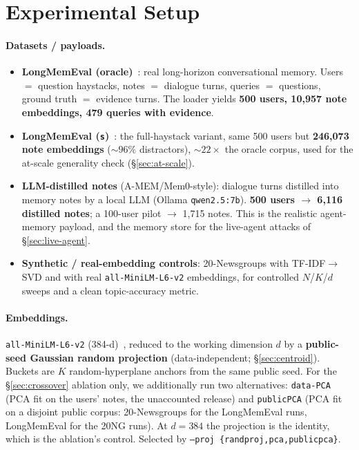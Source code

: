 \documentclass[pdflatex,sn-mathphys-num,iicol]{sn-jnl}
\theoremstyle{thmstyleone}%
\theoremstyle{thmstyletwo}%
\theoremstyle{thmstylethree}%
\newcommand{\secref}[1]{\S\ref{#1}}
\begin{document}
\section{Experimental Setup}\label{sec:setup}

\paragraph{Datasets / payloads.}
\begin{itemize}
  \item \textbf{LongMemEval (oracle)}~\cite{wu2024longmemeval}: real long-horizon
    conversational memory. Users $=$ question haystacks, notes $=$ dialogue turns,
    queries $=$ questions, ground truth $=$ evidence turns. The loader yields
    \textbf{500 users, 10{,}957 note embeddings, 479 queries with evidence}.
  \item \textbf{LongMemEval (\texttt{s})}~\cite{wu2024longmemeval}: the full-haystack
    variant, same 500 users but \textbf{246{,}073 note embeddings} (${\sim}96\%$
    distractors), ${\sim}22\times$ the oracle corpus, used for the at-scale generality
    check (\secref{sec:at-scale}).
  \item \textbf{LLM-distilled notes} (A-MEM/Mem0-style): dialogue turns distilled into
    memory notes by a local LLM (Ollama \texttt{qwen2.5:7b}). \textbf{500 users
    $\to$ 6{,}116 distilled notes}; a 100-user pilot $\to$ 1{,}715 notes. This is the
    realistic agent-memory payload, and the memory store for the live-agent attacks of
    \secref{sec:live-agent}.
  \item \textbf{Synthetic / real-embedding controls}: 20-Newsgroups with
    TF-IDF$\to$SVD and with real \texttt{all-MiniLM-L6-v2} embeddings, for controlled
    $N$/$K$/$d$ sweeps and a clean topic-accuracy metric.
\end{itemize}

\paragraph{Embeddings.} \texttt{all-MiniLM-L6-v2} (384-d)~\cite{reimers2019sbert},
reduced to the working dimension $d$ by a \textbf{public-seed Gaussian random
projection} (data-independent; \secref{sec:centroid}). Buckets are $K$
random-hyperplane anchors from the same public seed. For the \secref{sec:crossover}
ablation only, we additionally run two alternatives: \texttt{data-PCA} (PCA fit on the
users' notes, the unaccounted release) and \texttt{publicPCA} (PCA fit on a disjoint
public corpus: 20-Newsgroups for the LongMemEval runs, LongMemEval for the 20NG runs).
At $d = 384$ the projection is the identity, which is the ablation's control. Selected
by \texttt{--proj \{randproj,pca,publicpca\}}.
\end{document}

